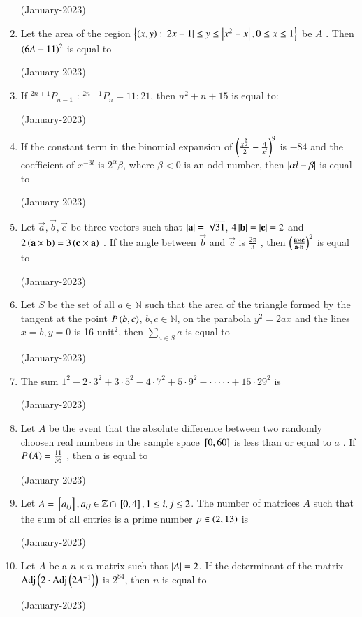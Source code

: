\documentclass[journal]{IEEEtran}
\begin{document}
\begin{enumerate}
\hfill(January-2023)

\item Let the area of the region $\left\{\left(x,y\right) : \left\vert2x-1\right\vert \leq y \leq \left\vert x^2 - x\right\vert, 0 \leq x \leq 1\right\}$
 be $A$ . Then $\left(6A + 11\right)^2$  
 is equal to 

 \hfill(January-2023)

 \item If $^{2n+1}P_{n-1} \text{ : } ^{2n-1}P_n = 11:21$, then $n^2 + n +15$ is equal to:

\hfill (January-2023)

\item If the constant term in the binomial expansion of 
$\left(\frac{x^{\frac{5}{2}}}{2} - \frac{4}{x^l}\right)^9$ is $-84$ and the coefficient of $x^{-3l}$ 
 is $2^{\alpha}\beta$, where $\beta < 0$
 is an odd number, then $\left\vert\alpha l - \beta\right\vert$
 is equal to

 \hfill(January-2023)

 \item Let $\vec{a}, \vec{b}, \vec{c}$
 be three vectors such that
$\left\vert\mathbf{a}\right\vert = \sqrt{31}$, $4\left\vert\mathbf{b}\right\vert = \left\vert\mathbf{c}\right\vert = 2$
 and $2\left(\mathbf{a} \times \mathbf{b}\right) = 3 \left(\mathbf{c} \times \mathbf{a}\right)$
. If the angle between $\vec{b}$
 and $\vec{c}$
 is $\frac{2\pi}{3}$
, then $\left(\frac{\mathbf{a} \times \mathbf{c}}{\mathbf{a}\cdot \mathbf{b}}\right)^2$ is equal to

\hfill (January-2023)

\item Let $S$ be the set of all $a \in \mathbb{N}$ such that the area of the triangle formed by the tangent at the point $P\left(b,c\right)$, $b,c \in \mathbb{N}$, on the parabola $y^2 = 2ax $ and the lines $x = b, y = 0 $ is 16 unit$^2$, then $\sum_{a \in S} a $ is equal to 

\hfill (January-2023)

\item The sum $1^2 - 2\cdot3^2 + 3\cdot5^2 - 4\cdot7^2 + 5\cdot9^2 - \cdot\cdot\cdot\cdot\cdot+ 15\cdot29^2$ is 

\hfill(January-2023)

\item Let $A$ be the event that the absolute difference between two randomly choosen real numbers in the sample space ${}\left[0,60\right]$
 is less than or equal to $a$ . If $P\left(A\right) = \frac{11}{36}$ , then $a$ 
 is equal to 

 \hfill (January-2023)

 \item Let $A = {}\left[a_{ij}\right], a_{ij} \in \mathbb{Z} \cap {}\left[0,4\right], 1 \leq i,j \leq 2$. 
The number of matrices $A$ such that the sum of all entries is a prime number $p \in \left(2,13\right)$ is 

\hfill (January-2023)

\item Let $A$ be a $n \times n $ matrix such that $\left\vert A\right\vert = 2$. If the determinant of the matrix $\operatorname{Adj}\left(2\cdot \operatorname{Adj}\left(2A^{-1}\right)\right)$ is $2^{84}$, then $n$ is equal to 

\hfill (January-2023)
\end{enumerate}
\end{document}
